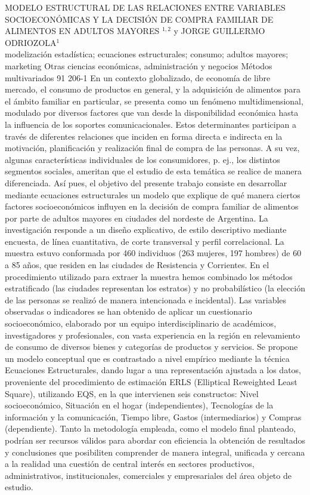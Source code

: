 \A
{MODELO ESTRUCTURAL DE LAS RELACIONES ENTRE VARIABLES SOCIOECONÓMICAS Y LA DECISIÓN DE COMPRA FAMILIAR DE ALIMENTOS EN ADULTOS MAYORES}
{$^{1,2}$ y JORGE GUILLERMO ODRIOZOLA$^1$}
{
\\}
{modelización estadística; ecuaciones estructurales; consumo; adultos mayores; marketing} 
 {Otras ciencias económicas, administración y negocios} 
 {Métodos multivariados} 
 {91} 
 {206-1}
{En un contexto globalizado, de economía de libre mercado, el consumo de productos en general, y la adquisición de alimentos para el ámbito familiar en particular, se presenta como un fenómeno multidimensional, modulado por diversos factores que van desde la disponibilidad económica hasta la influencia de los soportes comunicacionales. Estos determinantes participan a través de diferentes relaciones que inciden en forma directa e indirecta en la motivación, planificación y realización final de compra de las personas. A su vez, algunas características individuales de los consumidores, p. ej., los distintos segmentos sociales, ameritan que el estudio de esta temática se realice de manera diferenciada. Así pues, el objetivo del presente trabajo consiste en desarrollar mediante ecuaciones estructurales un modelo que explique de qué manera ciertos factores socioeconómicos influyen en la decisión de compra familiar de alimentos por parte de adultos mayores en ciudades del nordeste de Argentina. La investigación responde a un diseño explicativo, de estilo descriptivo mediante encuesta, de línea cuantitativa, de corte transversal y perfil correlacional. La muestra estuvo conformada por 460 individuos (263 mujeres, 197 hombres) de 60 a 85 años, que residen en las ciudades de Resistencia y Corrientes. En el procedimiento utilizado para extraer la muestra hemos combinado los métodos estratificado (las ciudades representan los estratos) y no probabilístico (la elección de las personas se realizó de manera intencionada e incidental). Las variables observadas o indicadores se han obtenido de aplicar un cuestionario socioeconómico, elaborado por un equipo interdisciplinario de académicos, investigadores y profesionales, con vasta experiencia en la región en relevamiento de consumo de diversos bienes y categorías de productos y servicios. Se propone un modelo conceptual que es contrastado a nivel empírico mediante la técnica Ecuaciones Estructurales, dando lugar a una representación ajustada a los datos, proveniente del procedimiento de estimación ERLS (Elliptical Reweighted Least Square), utilizando EQS, en la que intervienen seis constructos: Nivel socioeconómico, Situación en el hogar (independientes), Tecnologías de la información y la comunicación, Tiempo libre, Gastos (intermediarios) y Compras (dependiente). Tanto la metodología empleada, como el modelo final planteado, podrían ser recursos válidos para abordar con eficiencia la obtención de resultados y conclusiones que posibiliten comprender de manera integral, unificada y cercana a la realidad una cuestión de central interés en sectores productivos, administrativos, institucionales, comerciales y empresariales del área objeto de estudio.}
